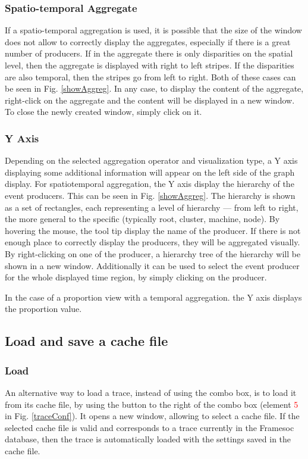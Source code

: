 \documentclass[twoside]{article}
\begin{document}
\begin{sloppypar}
\subsubsection{Spatio-temporal Aggregate}
If a spatio-temporal aggregation is used, it is possible that the size of the window does not allow to correctly display the aggregates, especially if there is a great number of producers. If in the aggregate there is only disparities on the spatial level, then the aggregate is displayed with right to left stripes. If the disparities are also temporal, then the stripes go from left to right. Both of these cases can be seen in Fig. \ref{showAggreg}. In any case, to display the content of the aggregate, right-click on the aggregate and the content will be displayed in a new window. To close the newly created window, simply click on it.

\subsubsection{Y Axis}
Depending on the selected aggregation operator and visualization type, a Y axis displaying some additional information will appear on the left side of the graph display. For spatiotemporal aggregation, the Y axis display the hierarchy of the event producers. This can be seen in Fig. \ref{showAggreg}. The hierarchy is shown as a set of rectangles, each representing a level of hierarchy --- from left to right, the more general to the specific (typically root, cluster, machine, node). By hovering the mouse, the tool tip display the name of the producer. If there is not enough place to correctly display the producers, they will be aggregated visually. By right-clicking on one of the producer, a hierarchy tree of the hierarchy will be shown in a new window. Additionally it can be used to select the event producer for the whole displayed time region, by simply clicking on the producer.

In the case of a proportion view with a temporal aggregation. the Y axis displays the proportion value.

\subsection{Load and save a cache file}
\subsubsection{Load}
An alternative way to load a trace, instead of using the combo box, is to load it from its cache file, by using the button to the right of the combo box (element \textcolor{red}{5} in Fig. \ref{traceConf}). It opens a new window, allowing to select a cache file. If the selected cache file is valid and corresponds to a trace currently in the Framesoc database, then the trace is automatically loaded with the settings saved in the cache file.


\end{sloppypar}
\end{document}
